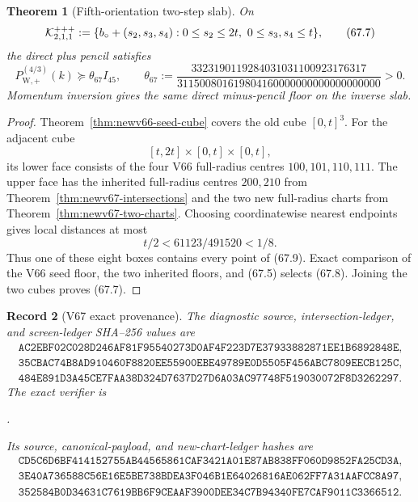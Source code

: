 \documentclass[11pt,oneside]{article}
\newtheorem{theorem}{Theorem}[section]
\newtheorem{record}[theorem]{Record}
\theoremstyle{definition}
\theoremstyle{remark}
\begin{document}
\begin{theorem}[Fifth-orientation two-step slab]
\label{thm:newv67-two-step-slab}
On
\[
 {\cal K}^{+++}_{2,1,1}:=
 \{b_\circ+(s_2,s_3,s_4):
       0\le s_2\le2t,\ 0\le s_3,s_4\le t\},           \tag{67.7}
\]
the direct plus pencil satisfies
\[
 P_{\mathrm W,+}^{(4/3)}(k)
 \succeq\theta_{67}I_{45},\qquad
 \theta_{67}:=
 \frac{3323190119284031031100923176317}
 {311500801619804160000000000000000000}>0.           \tag{67.8}
\]
Momentum inversion gives the same direct minus-pencil floor on the
inverse slab.
\end{theorem}

\begin{proof}
Theorem~\ref{thm:newv66-seed-cube} covers the old cube
\([0,t]^3\).  For the adjacent cube
\[
 [t,2t]\times[0,t]\times[0,t],                        \tag{67.9}
\]
its lower face consists of the four V66 full-radius centres
\(100,101,110,111\).  The upper face has the inherited full-radius
centres \(200,210\) from Theorem~\ref{thm:newv67-intersections} and
the two new full-radius charts from
Theorem~\ref{thm:newv67-two-charts}.  Choosing coordinatewise
nearest endpoints gives local distances at most
\[
 t/2<61123/491520<1/8.                                \tag{67.10}
\]
Thus one of these eight boxes contains every point of (67.9).
Exact comparison of the V66 seed floor, the two inherited floors,
and (67.5) selects (67.8).  Joining the two cubes proves (67.7).
\end{proof}

\begin{record}[V67 exact provenance]
\label{rec:newv67-provenance}
The diagnostic source, intersection-ledger, and screen-ledger
SHA--256 values are
\[
\begin{gathered}
\texttt{AC2EBF02C028D246AF81F95540273D0AF4F223D7E37933882871EE1B6892848E},\\
\texttt{35CBAC74B8AD910460F8820EE55900EBE49789E0D5505F456ABC7809EECB125C},\\
\texttt{484E891D3A45CE7FAA38D324D7637D27D6A03AC97748F519030072F8D3262297}.
\end{gathered}                                        \tag{67.11}
\]
The exact verifier is
\begin{center}
\footnotesize
{}.
\end{center}
Its source, canonical-payload, and new-chart-ledger hashes are
\[
\begin{gathered}
\texttt{CD5C6D6BF414152755AB44565861CAF3421A01E87AB838FF060D9852FA25CD3A},\\
\texttt{3E40A736588C56E16E5BE738BDEA3F046B1E64026816AE062FF7A31AAFCC8A97},\\
\texttt{352584B0D34631C7619BB6F9CEAAF3900DEE34C7B94340FE7CAF9011C3366512}.
\end{gathered}                                        \tag{67.12}
\]
\end{record}
\end{document}
